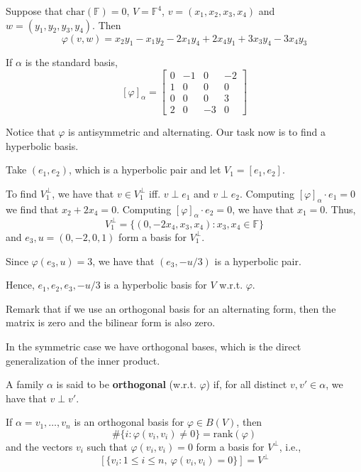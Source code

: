 \begin{example}
  Suppose that $\text{char}(\mathbb{F}) = 0$, $V = \mathbb{F}^4$, $v = (x_1, x_2, x_3, x_4)$ and $w = (y_1, y_2, y_3, y_4)$. Then 
  \[
    \varphi(v,w) = x_2 y_1 - x_1 y_2 - 2 x_1 y_4 + 2 x_4 y_1 + 3 x_3 y_4 - 3 x_4 y_3 
  \]

  If $\alpha$ is the standard basis, 
  \[
    [\varphi]_\alpha = \begin{bmatrix}
      0 & -1 & 0 & -2 \\
      1 & 0 & 0 & 0 \\
      0 & 0 & 0 & 3 \\
      2 & 0 & -3 & 0
    \end{bmatrix}
  \]

  Notice that $\varphi$ is antisymmetric and alternating. Our task now is to find a hyperbolic basis. 
   
  Take $(e_1, e_2)$, which is a hyperbolic pair and let $V_1 = [e_1, e_2]$. 

  To find $V_1^\perp$, we have that $v \in V_1^\perp$ iff. $v \perp e_1$ and $v \perp e_2$. Computing $[\varphi]_\alpha \cdot e_1 = 0$ we find that $x_2 + 2x_4 = 0$. Computing $[\varphi]_\alpha \cdot e_2 = 0$, we have that $x_1 = 0$. Thus, 
  \[
    V_1^\perp = \{ (0, -2x_4, x_3, x_4) : x_3, x_4 \in \mathbb{F} \}
  \]
  and $e_3, u = (0, -2, 0, 1)$ form a basis for $V_1^\perp$. 

  Since $\varphi(e_3, u) = 3$, we have that $(e_3, -u/3)$ is a hyperbolic pair.

  Hence, $e_1, e_2, e_3, -u/3$ is a hyperbolic basis for $V$ w.r.t. $\varphi$.
\end{example}

Remark that if we use an orthogonal basis for an alternating form, then the matrix is zero and the bilinear form is also zero.

In the symmetric case we have orthogonal bases, which is the direct generalization of the inner product. 

\begin{definition}
  A family $\alpha$ is said to be \textbf{orthogonal} (w.r.t. $\varphi$) if, for all distinct $v, v' \in \alpha$, we have that $v \perp v'$.
\end{definition}

If $\alpha = v_1, \ldots, v_n$ is an orthogonal basis for $\varphi \in B(V)$, then 
\[
  \# \{ i : \varphi(v_i, v_i) \neq 0 \} = \text{rank}(\varphi)
\]
and the vectors $v_i$ such that $\varphi(v_i, v_i) = 0$ form a basis for $V^\perp$, i.e.,
\[
  [\{ v_i : 1 \leq i \leq n, ~\varphi(v_i, v_i) = 0 \} ] = V^\perp
\]

